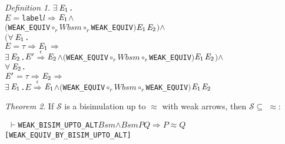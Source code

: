 \documentclass[GCNS]{yincog}
\renewcommand{\HOLConst}[1]{\texttt{#1}}
\renewcommand{\HOLBoundVar}[1]{\ensuremath{\mathit{#1}}}
\renewcommand{\HOLFreeVar}[1]{\ensuremath{\mathit{#1}}}
\renewcommand{\HOLSymConst}[1]{#1}
\renewcommand{\HOLTokenConj}{\ensuremath{\wedge}}
\renewcommand{\HOLTokenRCompose}{\ensuremath{\circ _r}}
\renewcommand{\HOLTokenExists}{\ensuremath{\exists \,}}
\renewcommand{\HOLTokenForall}{\ensuremath{\forall \,}}
\renewcommand{\HOLTokenTurnstile}{\ensuremath{\:\:\vdash}}
\theoremstyle{remark}
\newtheorem{definition}{Definition}[section]
\theoremstyle{theorem}
\newtheorem{theorem}[definition]{Theorem}
\theoremstyle{remark}
\newcommand{\HOLTokenWeakEQ}{$\approx$}
\newcommand{\HOLTokenEPS}{$\overset{\epsilon}{\Longrightarrow}$}
\newcommand{\HOLTokenWeakTransBegin}{$=$}
\newcommand{\HOLTokenWeakTransEnd}{$\Rightarrow$\xspace}
\renewcommand{\HOLTokenImp}{\ensuremath{\Longrightarrow}}
\begin{document}
\begin{definition}
\begin{alltt}
                  \HOLSymConst{\HOLTokenExists{}}\ensuremath{\HOLBoundVar{E}\sb{\mathrm{1}}}.
                      \HOLBoundVar{E} \HOLTokenWeakTransBegin\HOLConst{label} \HOLBoundVar{l}\HOLTokenWeakTransEnd \ensuremath{\HOLBoundVar{E}\sb{\mathrm{1}}} \HOLSymConst{\HOLTokenConj{}}
                      \ensuremath{(}\HOLConst{WEAK\_EQUIV} \HOLSymConst{\HOLTokenRCompose{}} \HOLFreeVar{Wbsm} \HOLSymConst{\HOLTokenRCompose{}} \HOLConst{WEAK\_EQUIV}\ensuremath{)} \ensuremath{\HOLBoundVar{E}\sb{\mathrm{1}}} \ensuremath{\HOLBoundVar{E}\sb{\mathrm{2}}}\ensuremath{)} \HOLSymConst{\HOLTokenConj{}}
         \ensuremath{(}\HOLSymConst{\HOLTokenForall{}}\ensuremath{\HOLBoundVar{E}\sb{\mathrm{1}}}.
              \HOLBoundVar{E} \HOLTokenWeakTransBegin\HOLSymConst{\ensuremath{\tau}}\HOLTokenWeakTransEnd \ensuremath{\HOLBoundVar{E}\sb{\mathrm{1}}} \HOLSymConst{\HOLTokenImp{}}
              \HOLSymConst{\HOLTokenExists{}}\ensuremath{\HOLBoundVar{E}\sb{\mathrm{2}}}. \ensuremath{\HOLBoundVar{E}\sp{\prime}} \HOLSymConst{\HOLTokenEPS} \ensuremath{\HOLBoundVar{E}\sb{\mathrm{2}}} \HOLSymConst{\HOLTokenConj{}} \ensuremath{(}\HOLConst{WEAK\_EQUIV} \HOLSymConst{\HOLTokenRCompose{}} \HOLFreeVar{Wbsm} \HOLSymConst{\HOLTokenRCompose{}} \HOLConst{WEAK\_EQUIV}\ensuremath{)} \ensuremath{\HOLBoundVar{E}\sb{\mathrm{1}}} \ensuremath{\HOLBoundVar{E}\sb{\mathrm{2}}}\ensuremath{)} \HOLSymConst{\HOLTokenConj{}}
         \HOLSymConst{\HOLTokenForall{}}\ensuremath{\HOLBoundVar{E}\sb{\mathrm{2}}}.
             \ensuremath{\HOLBoundVar{E}\sp{\prime}} \HOLTokenWeakTransBegin\HOLSymConst{\ensuremath{\tau}}\HOLTokenWeakTransEnd \ensuremath{\HOLBoundVar{E}\sb{\mathrm{2}}} \HOLSymConst{\HOLTokenImp{}}
             \HOLSymConst{\HOLTokenExists{}}\ensuremath{\HOLBoundVar{E}\sb{\mathrm{1}}}. \HOLBoundVar{E} \HOLSymConst{\HOLTokenEPS} \ensuremath{\HOLBoundVar{E}\sb{\mathrm{1}}} \HOLSymConst{\HOLTokenConj{}} \ensuremath{(}\HOLConst{WEAK\_EQUIV} \HOLSymConst{\HOLTokenRCompose{}} \HOLFreeVar{Wbsm} \HOLSymConst{\HOLTokenRCompose{}} \HOLConst{WEAK\_EQUIV}\ensuremath{)} \ensuremath{\HOLBoundVar{E}\sb{\mathrm{1}}} \ensuremath{\HOLBoundVar{E}\sb{\mathrm{2}}}
\end{alltt}
%
\end{definition}

\begin{theorem}
If $\mathcal{S}$ is a bisimulation up to $\approx $ with weak arrows, then
$\mathcal{S} \subseteq \;\approx $:
%
\begin{alltt}
\HOLTokenTurnstile{} \HOLConst{WEAK\_BISIM\_UPTO\_ALT} \HOLFreeVar{Bsm} \HOLSymConst{\HOLTokenConj{}} \HOLFreeVar{Bsm} \HOLFreeVar{P} \HOLFreeVar{Q} \HOLSymConst{\HOLTokenImp{}} \HOLFreeVar{P} \HOLSymConst{\HOLTokenWeakEQ} \HOLFreeVar{Q}\hfill{[WEAK\_EQUIV\_BY\_BISIM\_UPTO\_ALT]}
\end{alltt}
%
\end{theorem}
\end{document}
